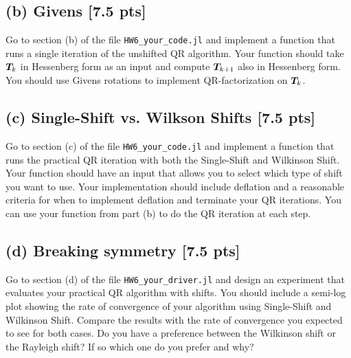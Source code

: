 \documentclass[twoside,10pt]{article}
\begin{document}
\subsection*{(b) Givens [7.5 pts]} 
Go to section (b) of the file \texttt{HW6\_your\_code.jl} and implement a function that runs a single iteration of the unshifted QR algorithm. Your function should take $\bm{T}_{k}$ in Hessenberg form as an input and compute $\bm{T}_{k+1}$ also in Hessenberg form. You should use Givens rotations to implement QR-factorization on $\bm{T}_{k}$.

\subsection*{(c) Single-Shift vs. Wilkson Shifts [7.5 pts]}
Go to section (c) of the file \texttt{HW6\_your\_code.jl} and implement a function that runs the practical QR iteration with both the Single-Shift and Wilkinson Shift. Your function should have an input that allows you to select which type of shift you want to use.  Your implementation should include deflation and a reasonable criteria for when to implement deflation and terminate your QR iterations. You can use your function from part (b) to do the QR iteration at each step.

\subsection*{(d) Breaking symmetry [7.5 pts]}
Go to section (d) of the file \texttt{HW6\_your\_driver.jl} and design an experiment that evaluates your practical QR algorithm with shifts. You should include a semi-log plot showing the rate of convergence of your algorithm using Single-Shift and Wilkinson Shift. Compare the results with the rate of convergence you expected to see for both cases. Do you have a preference between the Wilkinson shift or the Rayleigh shift?  If so which one do you prefer and why?
\end{document}
